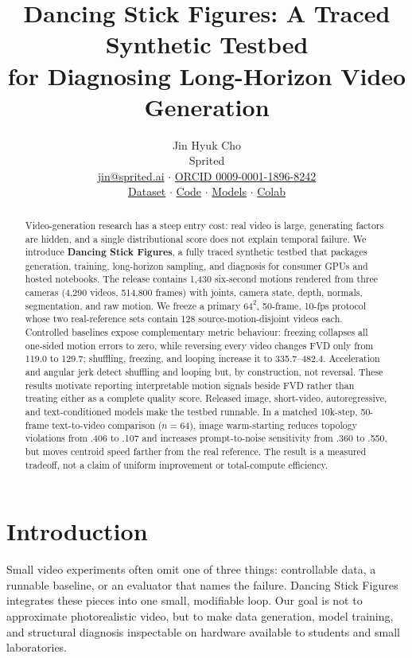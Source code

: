 \documentclass[10pt,twocolumn]{article}
\title{\vspace{-1.5em}\textbf{Dancing Stick Figures: A Traced Synthetic Testbed\\for Diagnosing Long-Horizon Video Generation}}
\author{Jin Hyuk Cho\\Sprited\\\small\href{mailto:jin@sprited.ai}{jin@sprited.ai} $\cdot$
\href{https://orcid.org/0009-0001-1896-8242}{ORCID 0009-0001-1896-8242}\\[-2pt]
\small\href{https://huggingface.co/datasets/sprited/dancing-stick-figures}{Dataset} $\cdot$
\href{https://github.com/sprited-ai/dancing-stick-figures}{Code} $\cdot$
\href{https://huggingface.co/sprited/dancing-stick-figures-baselines}{Models} $\cdot$
\href{https://colab.research.google.com/github/sprited-ai/dancing-stick-figures/blob/main/notebooks/dancing_stick_figures_colab.ipynb}{Colab}}
\date{}
\begin{document}
\raggedbottom\maketitle\vspace{-1.25em}
\begin{abstract}
Video-generation research has a steep entry cost: real video is large, generating factors are hidden, and a single
distributional score does not explain temporal failure. We introduce \textbf{Dancing Stick Figures}, a fully traced
synthetic testbed that packages generation, training, long-horizon sampling, and diagnosis for consumer GPUs and
hosted notebooks. The release contains 1,430 six-second motions rendered from three cameras (4,290 videos, 514,800
frames) with joints, camera state, depth, normals, segmentation, and raw motion. We freeze a primary $64^2$, 50-frame,
10-fps protocol whose two real-reference sets contain 128 source-motion-disjoint videos each. Controlled baselines
expose complementary metric behaviour: freezing collapses all one-sided motion errors to zero, while reversing every
video changes FVD only from 119.0 to 129.7; shuffling, freezing, and looping increase it to 335.7--482.4. Acceleration
and angular jerk detect shuffling and looping but, by construction, not reversal. These results motivate reporting
interpretable motion signals beside FVD rather than treating either as a complete quality score. Released image,
short-video, autoregressive, and text-conditioned models make the testbed runnable. In a matched 10k-step,
50-frame text-to-video comparison ($n=64$), image warm-starting reduces topology violations from .406 to .107 and
increases prompt-to-noise sensitivity from .360 to .550, but moves centroid speed farther from the real reference.
The result is a measured tradeoff, not a claim of uniform improvement or total-compute efficiency.
\end{abstract}

\section{Introduction}
Small video experiments often omit one of three things: controllable data, a runnable baseline, or an evaluator that
names the failure. Dancing Stick Figures integrates these pieces into one small, modifiable loop. Our goal is not to
approximate photorealistic video, but to make data generation, model training, and structural diagnosis inspectable on
hardware available to students and small laboratories.
\end{document}
